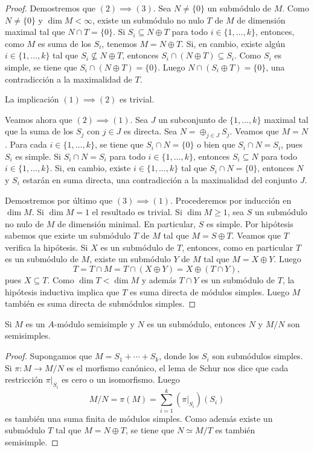 \begin{proof}
	Demostremos que $(2)\implies(3)$.
	Sea $N\ne\{0\}$ un submódulo de $M$. Como $N\ne\{0\}$ y $\dim M<\infty$, existe
	un submódulo no nulo $T$ de $M$ de dimensión maximal
	tal que $N\cap T=\{0\}$. Si $S_i\subseteq N\oplus T$ para todo $i\in\{1,\dots,k\}$, entonces, como $M$ es suma de los $S_i$, tenemos $M=N\oplus T$. 
	Si, en cambio, existe algún $i\in\{1,\dots,k\}$ tal que $S_i\not\subseteq N\oplus T$, entonces $S_i\cap (N\oplus T)\subseteq S_i$. Como $S_i$ es simple,
	se tiene que $S_i\cap (N\oplus T)=\{0\}$. Luego $N\cap (S_i\oplus T)=\{0\}$, una contradicción a la maximalidad de $T$.  
	
	La implicación $(1)\implies(2)$ es trivial. 
	
	Veamos ahora que $(2)\implies(1)$. Sea $J$ un subconjunto de $\{1,\dots,k\}$ maximal tal que 
	la suma de los $S_j$ con $j\in J$ es directa. Sea $N=\oplus_{j\in J}S_j$. Veamos que $M=N$. 
	Para cada $i\in\{1,\dots,k\}$, se tiene que $S_i\cap N=\{0\}$ o bien que $S_i\cap N=S_i$, pues
	$S_i$ es simple. Si $S_i\cap N=S_i$ para todo $i\in\{1,\dots,k\}$, entonces $S_i\subseteq N$ para todo $i\in\{1,\dots,k\}$.  
	Si, en cambio, existe $i\in\{1,\dots,k\}$ tal que $S_i\cap N=\{0\}$, entonces $N$ y $S_i$ estarán en suma directa, 
	una contradicción a la maximalidad del conjunto $J$.
	
	Demostremos por último que $(3)\implies(1)$. 
	Procederemos por inducción en $\dim M$. Si $\dim M=1$ el resultado es trivial. Si $\dim M\geq1$, 
	sea $S$ un submódulo no nulo de $M$ de dimensión minimal. En particular, $S$ es simple. 
	Por hipótesis sabemos que existe un submódulo $T$ de $M$ tal que $M=S\oplus T$. Veamos que $T$ verifica la hipótesis. 
	Si $X$ es un submódulo de $T$, entonces, como en particular $T$ es un submódulo de $M$, existe un submódulo $Y$ de $M$ tal que
	$M=X\oplus Y$. Luego 
	\[
	T=T\cap M=T\cap (X\oplus Y)=X\oplus (T\cap Y),
	\]
	pues $X\subseteq T$. 
	Como $\dim T<\dim M$ y además $T\cap Y$ es un submódulo de $T$, la hipótesis inductiva 
	implica que $T$ es suma directa de módulos simples. Luego $M$ también es suma
	directa de submódulos simples. 
\end{proof}

\begin{proposition}
Si $M$ es un $A$-módulo semisimple y $N$ es un submódulo, entonces $N$ y $M/N$ son semisimples.	
\end{proposition}

\begin{proof}
	Supongamos que $M=S_1+\cdots+ S_k$, donde los $S_i$ son submódulos simples. Si $\pi\colon M\to M/N$ es el morfismo canónico, el lema de Schur nos dice que  
	cada restricción $\pi|_{S_i}$ es cero o un isomorfismo. Luego
	\[
	M/N=\pi(M)=\sum_{i=1}^k(\pi|_{S_i})(S_i)
	\]
	es también una suma finita de módulos simples. Como además existe un submódulo $T$ tal que 
	$M=N\oplus T$, se tiene que $N\simeq M/T$ es también semisimple.    
\end{proof}

